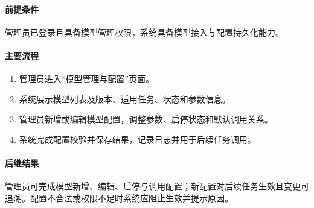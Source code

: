 
\paragraph*{前提条件}

管理员已登录且具备模型管理权限，系统具备模型接入与配置持久化能力。

\paragraph*{主要流程}

\begin{enumerate}
    \item 管理员进入“模型管理与配置”页面。
    \item 系统展示模型列表及版本、适用任务、状态和参数信息。
    \item 管理员新增或编辑模型配置，调整参数、启停状态和默认调用关系。
    \item 系统完成配置校验并保存结果，记录日志并用于后续任务调用。
\end{enumerate}

\paragraph*{后继结果}

管理员可完成模型新增、编辑、启停与调用配置；新配置对后续任务生效且变更可追溯。配置不合法或权限不足时系统应阻止生效并提示原因。
